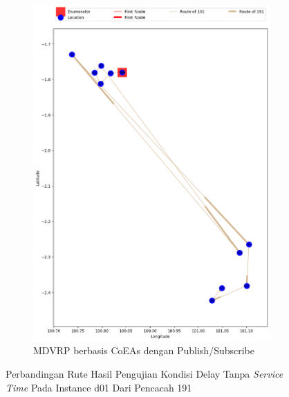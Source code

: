 \begin{figure}[H]\ContinuedFloat
	\centering
	\begin{subfigure}[t]{\textwidth}
		\centering
		\includegraphics[width=\textwidth]{Resources/Images/delayed_1/real_m15_n100_delayed_1_191_pubsub_coes}
		\caption{MDVRP berbasis CoEAs dengan Publish/Subscribe}
		\label{fig:real_m15_n100_delayed_1_191_pubsub_coes}
	\end{subfigure}
	\caption{Perbandingan Rute Hasil Pengujian Kondisi Delay Tanpa \textit{Service Time} Pada Instance d01 Dari Pencacah 191}
	\label{fig:real_m15_n100_delayed_1_191_contd}
\end{figure}


